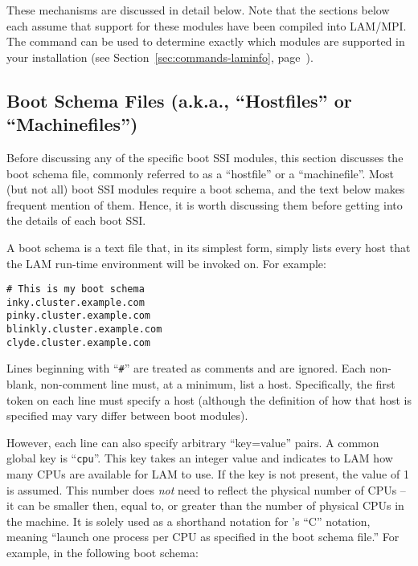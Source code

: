 These mechanisms are discussed in detail below.  Note that the
sections below each assume that support for these modules have been
compiled into LAM/MPI.  The  command can be used to
determine exactly which modules are supported in your installation
(see Section~\ref{sec:commands-laminfo},
page~\pageref{sec:commands-laminfo}).


\subsection{Boot Schema Files (a.k.a., ``Hostfiles'' or
  ``Machinefiles'')}
\label{sec:lam-ssi-boot-schema}

Before discussing any of the specific boot SSI modules, this section
discusses the boot schema file, commonly referred to as a ``hostfile''
or a ``machinefile''.  Most (but not all) boot SSI modules require a
boot schema, and the text below makes frequent mention of them.
Hence, it is worth discussing them before getting into the details of
each boot SSI.

A boot schema is a text file that, in its simplest form, simply lists
every host that the LAM run-time environment will be invoked on.  For
example:

\lstset{style=lam-shell}
\begin{lstlisting}
# This is my boot schema
inky.cluster.example.com
pinky.cluster.example.com
blinkly.cluster.example.com
clyde.cluster.example.com
\end{lstlisting}

Lines beginning with ``{\tt \#}'' are treated as comments and are
ignored.  Each non-blank, non-comment line must, at a minimum, list a
host.  Specifically, the first token on each line must specify a host
(although the definition of how that host is specified may vary differ
between boot modules).  

However, each line can also specify arbitrary ``key=value'' pairs.  A
common global key is ``{\tt cpu}''.  This key takes an integer value
and indicates to LAM how many CPUs are available for LAM to use.  If
the key is not present, the value of 1 is assumed.  This number does
{\em not} need to reflect the physical number of CPUs -- it can be
smaller then, equal to, or greater than the number of physical CPUs in
the machine.  It is solely used as a shorthand notation for
's ``C'' notation, meaning ``launch one process per CPU
as specified in the boot schema file.''  For example, in the following
boot schema:

